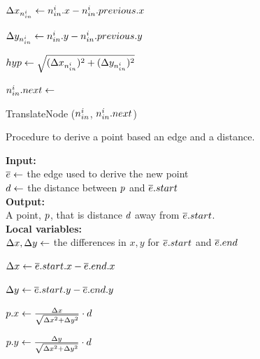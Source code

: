 \begin{algorithm}[tb!]
\begin{algorithmic}[1]
                \State $ \Delta x_{{n}_{in}^i} \gets {n}_{in}^i.x - {n}_{in}^i.previous.x $

                \State $ \Delta y_{{n}_{in}^i} \gets {n}_{in}^i.y - {n}_{in}^i.previous.y $

                \State $ hyp \gets \sqrt{(\Delta x_{{n}_{in}^i})^2 +(\Delta y_{{n}_{in}^i})^2} $

                \State $ {n}_{in}^i.next \gets $ 

                \State TranslateNode ($ {n}_{in}^i $, $ {n}_{in}^i.next $)

            \EndFor
        \EndProcedure
    \end{algorithmic}
\end{algorithm}



    \begin{algorithm}[tb!]
        \caption{Procedure to derive a point based an edge and a distance.}\label{alg:derive corridor point}
        \textbf{Input:} \\
        $ \protect\overline{e} \gets $ the edge used to derive the new point \\
        $ d \gets $ the distance between $ \PointP $ and $ \protect\overline{e}.start $ \\

        \textbf{Output:} \\
        A point, $ \PointP $, that is distance $ d $ away from $ \protect\overline{e}.start $. \\
    
        \textbf{Local variables:} \\
        $ \Delta x, \Delta y \gets $ the differences in $ x, y $ for $ \protect\overline{e}.start $ and $ \protect\overline{e}.end $ \\
    
        \begin{algorithmic}[1]
                \State $ \Delta x \gets \protect\overline{e}.start.x - \protect\overline{e}.end.x $
    
                \State $ \Delta y \gets \protect\overline{e}.start.y - \protect\overline{e}.end.y $
    
                \State $ p.x \gets \frac{\Delta x}{\sqrt{\Delta x^2 + \Delta y^2}} \cdot d $
    
                \State $ p.y \gets \frac{\Delta y}{\sqrt{\Delta x^2 + \Delta y^2}} \cdot d $
    
            \State \Return{$ \PointP $}
    
            \EndProcedure
    
        \end{algorithmic}
    \end{algorithm}
    
